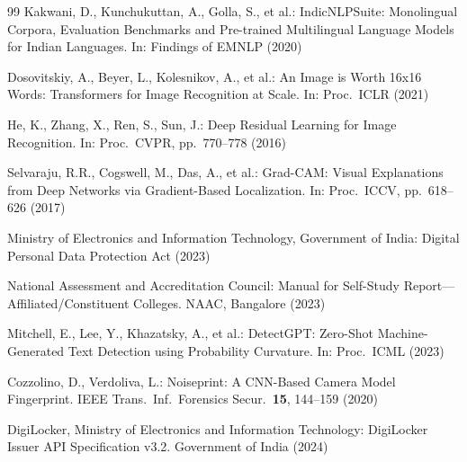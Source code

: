 \documentclass[runningheads]{llncs}
\begin{document}
\begin{thebibliography}{99}
Kakwani, D., Kunchukuttan, A., Golla, S., et al.: IndicNLPSuite: Monolingual Corpora, Evaluation Benchmarks and Pre-trained Multilingual Language Models for Indian Languages. In: Findings of EMNLP (2020)

Dosovitskiy, A., Beyer, L., Kolesnikov, A., et al.: An Image is Worth 16x16 Words: Transformers for Image Recognition at Scale. In: Proc.\ ICLR (2021)

He, K., Zhang, X., Ren, S., Sun, J.: Deep Residual Learning for Image Recognition. In: Proc.\ CVPR, pp.\ 770--778 (2016)

Selvaraju, R.R., Cogswell, M., Das, A., et al.: Grad-CAM: Visual Explanations from Deep Networks via Gradient-Based Localization. In: Proc.\ ICCV, pp.\ 618--626 (2017)

Ministry of Electronics and Information Technology, Government of India: Digital Personal Data Protection Act (2023)

National Assessment and Accreditation Council: Manual for Self-Study Report---Affiliated/Constituent Colleges. NAAC, Bangalore (2023)

Mitchell, E., Lee, Y., Khazatsky, A., et al.: DetectGPT: Zero-Shot Machine-Generated Text Detection using Probability Curvature. In: Proc.\ ICML (2023)

Cozzolino, D., Verdoliva, L.: Noiseprint: A CNN-Based Camera Model Fingerprint. IEEE Trans.\ Inf.\ Forensics Secur.\ \textbf{15}, 144--159 (2020)

DigiLocker, Ministry of Electronics and Information Technology: DigiLocker Issuer API Specification v3.2. Government of India (2024)

\end{thebibliography}
\end{document}
